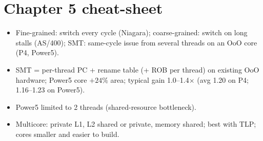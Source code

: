 \section{Chapter 5 cheat-sheet}
\begin{key}
\begin{itemize}
\item Fine-grained: switch every cycle (Niagara); coarse-grained: switch on long stalls (AS/400); SMT: same-cycle issue from several threads on an OoO core (P4, Power5).
\item SMT = per-thread PC + rename table (+ ROB per thread) on existing OoO hardware; Power5 core $+24\%$ area; typical gain 1.0--1.4$\times$ (avg 1.20 on P4; 1.16--1.23 on Power5).
\item Power5 limited to 2 threads (shared-resource bottleneck).
\item Multicore: private L1, L2 shared or private, memory shared; best with TLP; cores smaller and easier to build.
\end{itemize}
\end{key}
